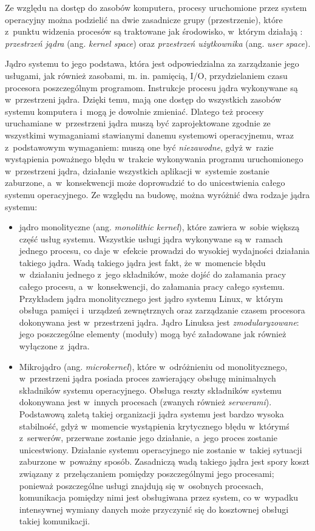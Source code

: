 \documentclass[12pt,makeidx]{mwart}
\begin{document}
%
\indent
	Ze względu na dostęp do zasobów komputera, procesy uruchomione przez system operacyjny można podzielić 
	na dwie zasadnicze grupy (przestrzenie), które z~punktu widzenia procesów są traktowane jak środowisko, w~którym działają : 
	\emph{przestrzeń jądra} (ang. \emph{kernel space}) oraz \emph{przestrzeń użytkownika} (ang. \emph{user space}).
\par
%
\indent
	Jądro systemu to jego podstawa, która jest odpowiedzialna za zarządzanie jego usługami, jak również zasobami, m. in. pamięcią, I/O,
	przydzielaniem czasu procesora poszczególnym programom. Instrukcje procesu jądra wykonywane są w~przestrzeni jądra. Dzięki temu,
	mają one dostęp do wszystkich zasobów systemu komputera i~mogą je dowolnie zmieniać. Dlatego też procesy uruchamiane w~przestrzeni
	jądra muszą być zaprojektowane zgodnie ze wszystkimi wymaganiami stawianymi danemu systemowi operacyjnemu, wraz z~podstawowym wymaganiem:
	muszą one być \emph{niezawodne}, gdyż w~razie wystąpienia poważnego błędu w~trakcie wykonywania programu uruchomionego w~przestrzeni jądra,
	działanie wszystkich aplikacji w~systemie zostanie zaburzone, a~w~konsekwencji może doprowadzić to do unicestwienia całego systemu operacyjnego.
	Ze względu na budowę, można wyróżnić dwa rodzaje jądra systemu:
	\begin{itemize}
		\item jądro monolityczne (ang. \emph{monolithic kernel}), które zawiera w~sobie większą część usług systemu. Wszystkie usługi jądra
			wykonywane są w~ramach jednego procesu, co daje w~efekcie prowadzi do wysokiej wydajności działania takiego jądra. Wadą takiego jądra
			jest fakt, że w~momencie błędu w~działaniu jednego z~jego składników, może dojść do załamania pracy całego procesu, a~w~konsekwencji,
			do załamania pracy całego systemu.
			Przykładem jądra monolitycznego jest jądro systemu Linux, w~którym obsługa pamięci i~urządzeń zewnętrznych oraz zarządzanie czasem procesora
			dokonywana jest w~przestrzeni jądra. Jądro Linuksa jest \emph{zmodularyzowane}: jego poszczególne elementy (moduły) mogą być załadowane
			jak również wyłączone z~jądra.
		\item Mikrojądro (ang. \emph{microkernel}), które w~odróżnieniu od monolitycznego, w~przestrzeni jądra posiada proces zawierający
			obsługę minimalnych składników systemu operacyjnego. Obsługa reszty składników systemu dokonywana jest w~innych procesach
			(zwanych również \emph{serwerami}). Podstawową zaletą takiej organizacji jądra systemu jest bardzo wysoka stabilność, gdyż w~momencie
			wystąpienia krytycznego błędu w~którymś z~serwerów, przerwane zostanie jego działanie, a~jego proces zostanie unicestwiony.
			Działanie systemu operacyjnego nie zostanie w~takiej sytuacji
			zaburzone w~poważny sposób. Zasadniczą wadą takiego jądra jest spory koszt związany z~przełączaniem pomiędzy poszczególnymi jego procesami;
			ponieważ poszczególne usługi znajdują się w~osobnych procesach, komunikacja pomiędzy nimi jest obsługiwana przez system, co
			w~wypadku intensywnej wymiany danych może przyczynić się do kosztownej obsługi takiej komunikacji.
	\end{itemize}
\end{document}
